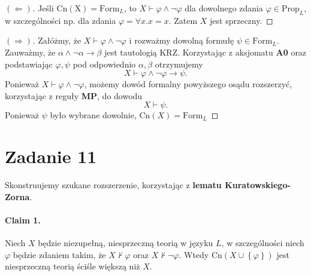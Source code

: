 \begin{proof}[\((\Leftarrow)\)]
    Jeśli \( \mathrm{Cn(X)} = \mathrm{Form}_L \), to \( X \vdash \varphi \wedge \neg\varphi \) dla dowolnego zdania \( \varphi \in \mathrm{Prop}_L \), w szczególności np. dla zdania \( \varphi = \forall x. x = x \). Zatem \( X \) jest sprzeczny.
\end{proof}

\begin{proof}[\( (\Rightarrow) \)]
Załóżmy, że \( X \vdash \varphi \wedge \neg \varphi \) i rozważmy dowolną formułę \( \psi \in \mathrm{Form}_L \).
Zauważmy, że \( \alpha \wedge \neg \alpha \to \beta \) jest tautologią KRZ. Korzystając z aksjomatu \textbf{A0} oraz podstawiając \( \varphi, \psi \) pod odpowiednio \( \alpha, \beta \) otrzymujemy
\[ 
    X \vdash \varphi \wedge \neg \varphi \to \psi.
\]
Ponieważ \( X \vdash \varphi \wedge \neg \varphi \), możemy dowód formalny powyższego osądu rozszerzyć, korzystając z reguły \textbf{MP}, do dowodu
\[ 
    X \vdash \psi. 
\]
Ponieważ \( \psi \) było wybrane dowolnie, \( \mathrm{Cn}(X) = \mathrm{Form}_L \)
\end{proof}

\newpage
\section*{Zadanie 11}

Skonstruujemy szukane rozszerzenie, korzystając z \textbf{lematu Kuratowskiego-Zorna}. 

\paragraph{Claim 1.} Niech \( X \) będzie niezupełną, niesprzeczną teorią w języku \( L \), w szczególności niech \( \varphi \) będzie zdaniem takim, że \( X \not\vdash \varphi \) oraz \( X \not\vdash \neg\varphi \). Wtedy \( \mathrm{Cn}(X \cup \left\{ \varphi \right\}) \) jest niesprzeczną teorią ściśle większą niż \( X \).

